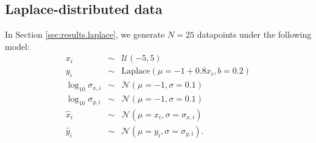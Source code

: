 \documentclass[fleqn,usenatbib]{rasti}
\begin{document}
\subsection{Laplace-distributed data}
\label{sec:data-models.laplace}

In Section \ref{sec:results.laplace}, we generate $N = 25$ datapoints under the
following model:
\begin{eqnarray}
    x_i &\sim& \mathcal U (-5, 5) \\
    y_i &\sim& \mathrm{Laplace} (\mu = -1 + 0.8 x_i, b = 0.2) \\
    \log_{10} \sigma_{x, i} &\sim& \mathcal N (\mu = -1, \sigma = 0.1) \\
    \log_{10} \sigma_{y, i} &\sim& \mathcal N (\mu = -1, \sigma = 0.1) \\
    \hat{x}_i &\sim& \mathcal N (\mu = x_i, \sigma = \sigma_{x, i}) \\
    \hat{y}_i &\sim& \mathcal N (\mu = y_i, \sigma = \sigma_{y, i}).
\end{eqnarray}






\bsp	%
\label{lastpage}
\end{document}
